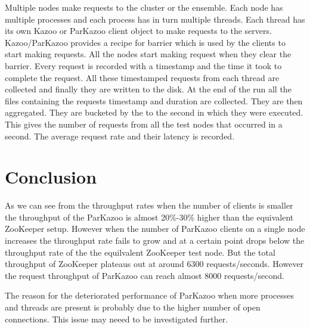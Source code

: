Multiple nodes make requests to the cluster or the ensemble. Each node has multiple processes and each process has in turn multiple threads. Each thread has its own Kazoo or ParKazoo client object to make requests to the servers.
Kazoo/ParKazoo provides a recipe for barrier which is used by the clients to start making requests. All the nodes start making request when they clear the barrier. Every request is recorded with a timestamp and the time it took to complete the request. All these timestamped requests from each thread are collected and finally they are written to the disk. At the end of the run all the files containing the requests timestamp and duration are collected. They are then aggregated. They are bucketed by the to the second in which they were executed. This gives the number of requests from all the test nodes that occurred in a second. The average request rate and their latency is recorded. 

\section{Conclusion}
As we can see from the throughput rates when the number of clients is smaller the throughput of the ParKazoo is almost 20\%-30\% higher than the equivalent ZooKeeper setup. However when the number of ParKazoo clients on a single node increases the throughput rate fails to grow and at a certain point drops below the throughput rate of the the equilvalent ZooKeeper test node. But the total throughput of ZooKeeper plateaus out at around 6300 requests/seconds. However the request throughput of ParKazoo can reach almost 8000 requests/second.

The reason for the deteriorated performance of ParKazoo when more processes and threads are present is probably due to the higher number of open connections. This issue may neeed to be investigated further. 
